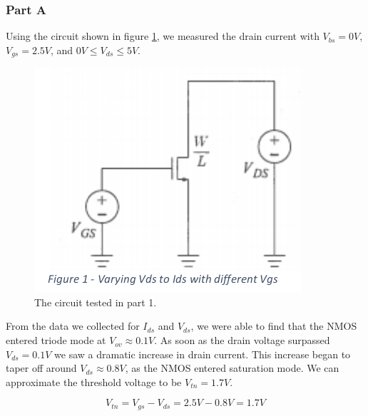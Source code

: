 \subsubsection{Part A}
		Using the circuit shown in figure \ref{fig:circuit1}, we measured the drain current with $V_{bs} = 0 V$, $V_{gs} = 2.5 V$, and $0V \le V_{ds} \le 5 V$.
		\FloatBarrier

		\begin{figure}[h!]
		\centering
		\includegraphics[scale=0.75]{./images/circuit1.png}
		\caption{The circuit tested in part 1.}
		\label{fig:circuit1}
		\end{figure}

		\FloatBarrier
		From the data we collected for $I_{ds}$ and $V_{ds}$, we were able to find that the NMOS entered triode mode at $V_{ov} \approx 0.1 V$. 
		As soon as the drain voltage surpassed $V_{ds}=0.1 V$ we saw a dramatic increase in drain current.
		This increase began to taper off around $V_{ds}\approx0.8V$, as the NMOS entered saturation mode. 
		We can approximate the threshold voltage to be $V_{tn} = 1.7 V$.

		\begin{equation}
		\label{eq:threshold}
		V_{tn} = V_{gs} - V_{ds} = 2.5 V - 0.8 V = 1.7 V
		\end{equation}

		\FloatBarrier

